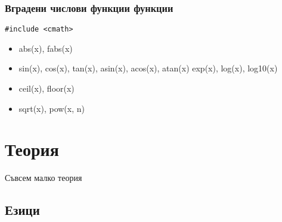 \documentclass{beamer}
\begin{document}
\begin{frame}[fragile]
\frametitle{Вградени числови функции функции}


\begin{lstlisting}
#include <cmath>
\end{lstlisting}

\pause

\begin{itemize}
\item abs(x), fabs(x)
\item sin(x), cos(x), tan(x), asin(x), acos(x), atan(x) exp(x), log(x), log10(x)
\item ceil(x), floor(x)
\item sqrt(x), pow(x, n)

\end{itemize}


\end{frame}



\section{Теория}

\begin{frame}
\centerline{Съвсем малко теория}
\end{frame}


\subsection{Езици}
\end{document}
